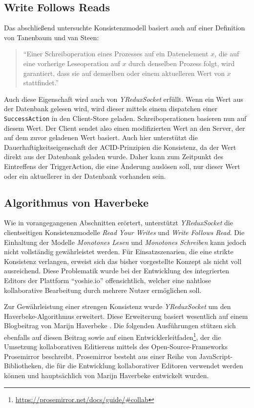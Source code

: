 \documentclass[12pt]{book}          %
\begin{document}
\subsection{Write Follows Reads}
\label{subsec-write-follows-reads}

Das abschließend untersuchte Konsistenzmodell basiert auch auf einer Definition von Tanenbaum und van Steen:

\begin{quote}
"`Einer Schreiboperation eines Prozesses auf ein Datenelement $x$, die auf eine vorherige Leseoperation auf $x$ durch denselben Prozess folgt, wird garantiert, dass sie auf demselben oder einem aktuelleren Wert von $x$ stattfindet."' \cite[326]{tanenbaum_verteilte_2008}
\end{quote}

Auch diese Eigenschaft wird auch von \textit{YReduxSocket} erfüllt. Wenn ein Wert aus der Datenbank gelesen wird, wird dieser mittels einem dispatchen einer \texttt{SuccessAction} in den Client-Store geladen. Schreiboperationen basieren nun auf diesem Wert. Der Client sendet also einen modifizierten Wert an den Server, der auf dem zuvor geladenen Wert basiert. Auch hier unterstützt die Dauerhaftigkeitseigenschaft der ACID-Prinzipien die Konsistenz, da der Wert direkt aus der Datenbank geladen wurde. Daher kann zum Zeitpunkt des Eintreffens der TriggerAction, die eine Änderung auslösen soll, nur dieser Wert oder ein aktuellerer in der Datenbank vorhanden sein.

\subsection{Algorithmus von Haverbeke}
\label{subsec-algorithmus von haverbeke}

Wie in vorangegangenen Abschnitten erörtert, unterstützt \textit{YReduxSocket} die clientseitigen Konsistenzmodelle \textit{Read Your Writes} und \textit{Write Follows Read}. Die Einhaltung der Modelle \textit{Monotones Lesen} und \textit{Monotones Schreiben} kann jedoch nicht vollständig gewährleistet werden. Für Einsatzszenarien, die eine strikte Konsistenz verlangen, erweist sich das bisher vorgestellte Konzept als nicht voll ausreichend. Diese Problematik wurde bei der Entwicklung des integrierten Editors der Plattform "`yoshie.io"' offensichtlich, welcher eine nahtlose kollaborative Bearbeitung durch mehrere Nutzer ermöglichen soll.

Zur Gewährleistung einer strengen Konsistenz wurde \textit{YReduxSocket} um den Haverbeke-Algorithmus erweitert. Diese Erweiterung basiert wesentlich auf einem Blogbeitrag von Marijn Haverbeke \cite{haverbeke_collaborative_2015}. Die folgenden Ausführungen stützen sich ebenfalls auf diesen Beitrag sowie auf einen Entwicklerleitfaden\footnote{\url{https://prosemirror.net/docs/guide/\#collab}}, der die Umsetzung kollaborativen Editierens mittels des Open-Source-Frameworks Prosemirror beschreibt. Prosemirror besteht aus einer Reihe von JavaScript-Bibliotheken, die für die Entwicklung kollaborativer Editoren verwendet werden können und hauptsächlich von Marijn Haverbeke entwickelt wurden.
\end{document}
